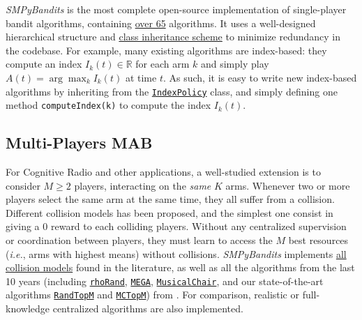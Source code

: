 \documentclass[a4paper,10pt,]{article}
\begin{document}
\emph{SMPyBandits} is the most complete open-source implementation of
single-player bandit algorithms,
containing \href{https://SMPyBandits.GitHub.io/docs/Policies.html}{over 65} algorithms.
It uses a well-designed hierarchical structure and
\href{https://SMPyBandits.GitHub.io/uml_diagrams/README.html}{class
inheritance scheme} to minimize redundancy in the codebase.
For example, many existing algorithms are index-based:
they compute an index $I_k(t)\in\mathbb{R}$ for each arm $k$ and simply play $A(t) = \arg\max_k I_k(t)$ at time $t$.
As such, it is easy to write new index-based algorithms by inheriting from the
\href{https://SMPyBandits.GitHub.io/docs/Policies.IndexPolicy.html}{\texttt{IndexPolicy}}
class, and simply defining one method \texttt{computeIndex(k)} to compute the index $I_k(t)$.


\subsection{Multi-Players MAB}\label{multi-players-mab}

For Cognitive Radio and other applications, a well-studied extension is to
consider \(M\geq2\) players, interacting on the \emph{same} \(K\) arms.
Whenever two or more players select the same arm at the same time, they
all suffer from a collision. Different collision models has been
proposed, and the simplest one consist in giving a \(0\) reward to each
colliding players. Without any centralized supervision or coordination
between players, they must learn to access the \(M\) best resources
(\emph{i.e.}, arms with highest means) without collisions.
\emph{SMPyBandits} implements
\href{https://SMPyBandits.GitHub.io/docs/Environment.CollisionModels.html}{all
collision models} found in the literature, as well as all the
algorithms from the last 10 years (including
\href{https://SMPyBandits.GitHub.io/docs/PoliciesMultiPlayers.rhoRand.html}{\texttt{rhoRand}},
\href{https://SMPyBandits.GitHub.io/docs/Policies.MEGA.html}{\texttt{MEGA}},
\href{https://SMPyBandits.GitHub.io/docs/Policies.MusicalChair.html}{\texttt{MusicalChair}}, and our state-of-the-art algorithms
\href{https://SMPyBandits.GitHub.io/docs/PoliciesMultiPlayers.RandTopM.html}{\texttt{RandTopM}}
and
\href{https://SMPyBandits.GitHub.io/docs/PoliciesMultiPlayers.MCTopM.html}{\texttt{MCTopM}})
from \citet{BessonALT2018}.
For comparison, realistic or full-knowledge centralized algorithms are also implemented.

\end{document}
